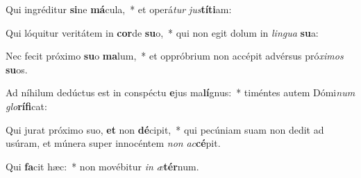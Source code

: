 \item Qui ingréditur \textbf{si}ne \textbf{má}cula,~* et operá\textit{tur} \textit{jus}\textbf{tí}\textbf{ti}am:
\item Qui lóquitur veritátem in \textbf{cor}de \textbf{su}o,~* qui non egit dolum in \textit{lin}\textit{gua} \textbf{su}a:
\item Nec fecit próximo \textbf{su}o \textbf{ma}lum,~* et oppróbrium non accépit advérsus pró\textit{xi}\textit{mos} \textbf{su}os.
\item Ad níhilum dedúctus est in conspéctu \textbf{e}jus ma\textbf{lí}gnus:~* timéntes autem Dómi\textit{num} \textit{glo}\textbf{rí}\textbf{fi}cat:
\item Qui jurat próximo suo, \textbf{et} non \textbf{dé}cipit,~* qui pecúniam suam non dedit ad usúram, et múnera super innocéntem \textit{non} \textit{ac}\textbf{cé}pit.
\item Qui \textbf{fa}cit hæc:~* non movébitur \textit{in} \textit{æ}\textbf{tér}num.
